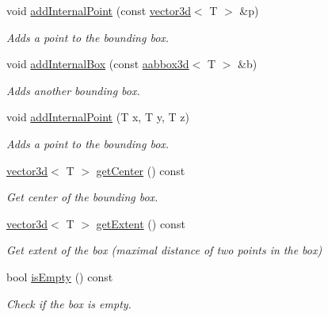 \begin{DoxyCompactItemize}
void \hyperlink{classirr_1_1core_1_1aabbox3d_a49e3765fd2f40a115f8f28bd74d62ccf}{add\+Internal\+Point} (const \hyperlink{classirr_1_1core_1_1vector3d}{vector3d}$<$ T $>$ \&p)
\begin{DoxyCompactList}\small\item\em Adds a point to the bounding box. \end{DoxyCompactList}\item 
void \hyperlink{classirr_1_1core_1_1aabbox3d_a7ccc210a3fb0ce82765d28f2047942c5}{add\+Internal\+Box} (const \hyperlink{classirr_1_1core_1_1aabbox3d}{aabbox3d}$<$ T $>$ \&b)
\begin{DoxyCompactList}\small\item\em Adds another bounding box. \end{DoxyCompactList}\item 
void \hyperlink{classirr_1_1core_1_1aabbox3d_a123947cb6d77a3e0d6cbb65b63e8b86f}{add\+Internal\+Point} (T x, T y, T z)
\begin{DoxyCompactList}\small\item\em Adds a point to the bounding box. \end{DoxyCompactList}\item 
\hyperlink{classirr_1_1core_1_1vector3d}{vector3d}$<$ T $>$ \hyperlink{classirr_1_1core_1_1aabbox3d_ad2e956303fd85f900f93c067fd9c2647}{get\+Center} () const
\begin{DoxyCompactList}\small\item\em Get center of the bounding box. \end{DoxyCompactList}\item 
\hyperlink{classirr_1_1core_1_1vector3d}{vector3d}$<$ T $>$ \hyperlink{classirr_1_1core_1_1aabbox3d_a6a1e82ae4fdb3cf9fac19905b772e03e}{get\+Extent} () const
\begin{DoxyCompactList}\small\item\em Get extent of the box (maximal distance of two points in the box) \end{DoxyCompactList}\item 
bool \hyperlink{classirr_1_1core_1_1aabbox3d_a99f4afcfa29afd6e353b4377e4cbae84}{is\+Empty} () const
\begin{DoxyCompactList}\small\item\em Check if the box is empty. \end{DoxyCompactList}\item 
\mbox{\label{classirr_1_1core_1_1aabbox3d_a780f6f14562aa550ba7d90ac079f23ec}} 

\end{DoxyCompactItemize}
